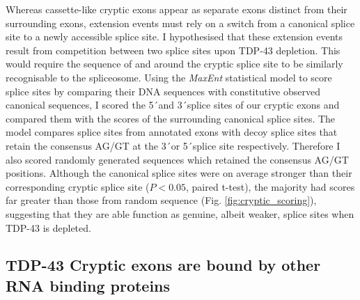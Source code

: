 Whereas cassette-like cryptic exons appear as separate exons distinct from their surrounding exons, extension events must rely on a switch from a canonical splice site to a newly accessible splice site. I hypothesised that these extension events result from competition between two splice sites upon TDP-43 depletion. This would require the sequence of and around the cryptic splice site to be similarly recognisable to the spliceosome. Using the \emph{MaxEnt} statistical model to score splice sites by comparing their DNA sequences with constitutive observed canonical sequences, I scored the 5\'\ and 3\'\ splice sites of our cryptic exons and compared them with the scores of the surrounding canonical splice sites. The model compares splice sites from annotated exons with decoy splice sites that retain the consensus AG/GT at the 3\'\ or 5\'\ splice site respectively. Therefore I also scored randomly generated sequences which retained the consensus AG/GT positions.  Although the canonical splice sites were on average stronger than their corresponding cryptic splice site ($P < 0.05$, paired t-test), the majority had scores far greater than those from random sequence (Fig. \ref{fig:cryptic_scoring}), suggesting that they are able function as genuine, albeit weaker, splice sites when TDP-43 is depleted.



\subsection{TDP-43 Cryptic exons are bound by other RNA binding proteins}

